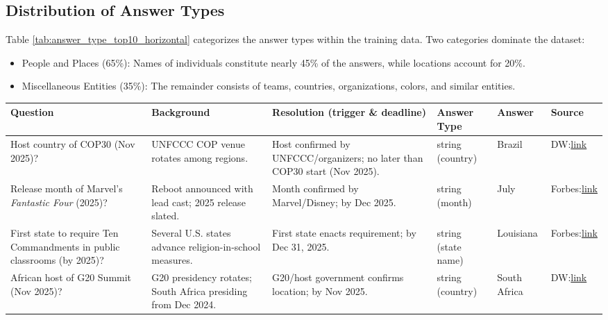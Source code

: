 \subsection{Distribution of Answer Types}
Table \ref{tab:answer_type_top10_horizontal} categorizes the answer types within the training data. Two categories dominate the dataset:
\begin{itemize}
    \item People and Places (65\%): Names of individuals constitute nearly 45\% of the answers, while locations account for 20\%.
    \item Miscellaneous Entities (35\%): The remainder consists of teams, countries, organizations, colors, and similar entities.
\end{itemize}

\begin{table}[h]
\centering
\small
\setlength{\tabcolsep}{4pt}
\renewcommand{\arraystretch}{1.2}
\begin{tabularx}{\textwidth}{L L L L L L}
\toprule
\textbf{Question} & \textbf{Background} & \textbf{Resolution (trigger \& deadline)} & \textbf{Answer Type} & \textbf{Answer} & \textbf{Source} \\
\midrule
Host country of COP30 (Nov 2025)? & UNFCCC COP venue rotates among regions. & Host confirmed by UNFCCC/organizers; no later than COP30 start (Nov 2025). & string (country) & Brazil & DW:\newline \href{https://www.dw.com/en/donald-trump-climate-policy-2025/a-71354256?maca=en-rss-en-all-1573-xml-atom}{link} \\
\midrule
Release month of Marvel's \emph{Fantastic Four} (2025)? & Reboot announced with lead cast; 2025 release slated. & Month confirmed by Marvel/Disney; by Dec 2025. & string (month) & July & Forbes:\newline \href{https://www.forbes.com/sites/caileygleeson/2024/02/16/x-men-fans-push-back-against-anger-over-non-binary-character/}{link} \\
\midrule
First state to require Ten Commandments in public classrooms (by 2025)? & Several U.S. states advance religion-in-school measures. & First state enacts requirement; by Dec 31, 2025. & string (state name) & Louisiana & Forbes:\newline \href{https://www.forbes.com/sites/maryroeloffs/2024/06/20/louisianas-new-ten-commandments-law-is-latest-example-of-states-pushing-to-allow-religion-in-public-schools/}{link} \\
\midrule
African host of G20 Summit (Nov 2025)? & G20 presidency rotates; South Africa presiding from Dec 2024. & G20/host government confirms location; by Nov 2025. & string (country) & South Africa & DW:\newline \href{https://www.dw.com/en/africa-in-2025-strengthening-democracy-key-to-growth/a-70945864}{link} \\

\end{tabularx}
\end{table}
